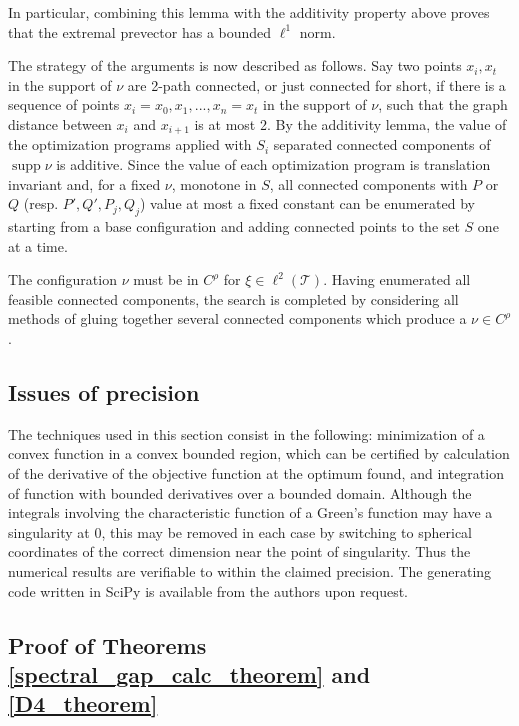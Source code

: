 \documentclass[a4paper, 12pt, notitlepage]{amsart}
\newcommand{\supp}{\operatorname{supp}}
\newcommand{\sT}{\mathscr{T}}
\theoremstyle{remark}
\begin{document}
In particular, combining this lemma with the additivity property above proves that the extremal prevector has a bounded $\ell^1$ norm.


The strategy of the arguments is now described as follows.  Say two points $x_i, x_t$ in the support of $\nu$ are  2-path connected, or just connected for short, if there is a sequence of points $x_i = x_0, x_1, ..., x_n = x_t$ in the support of $\nu$, such that the graph distance between $x_i$ and $x_{i+1}$ is at most 2. By the additivity lemma, the value of the optimization programs applied with $S_i$ separated connected components of $\supp \nu$ is additive.  Since the value of each optimization program is translation invariant and, for a fixed $\nu$, monotone in $S$, all connected components with $P$ or $Q$ (resp. $P', Q', P_j, Q_j$) value at most a fixed constant can be enumerated  by starting from a base configuration and adding connected points to the set $S$ one at a time.

The configuration $\nu$ must be in $C^\rho$ for $\xi \in \ell^2(\sT)$.  Having enumerated all feasible connected components, the search is completed by considering all methods of gluing together several connected components which produce a $\nu \in C^\rho$.  %

\subsection{Issues of precision}
The techniques used in this section consist in the following:
minimization of a convex function in a convex bounded region, which can be certified by calculation of the derivative of the objective function at the optimum found, and integration of function with bounded derivatives over a bounded domain.  Although the integrals involving the characteristic function of a Green's function may have a singularity at 0, this may be removed in each case by switching to spherical coordinates of the correct dimension near the point of singularity.  Thus the numerical results are verifiable to within the claimed precision.  The generating code written in SciPy is available from the authors upon request.  



\subsection{Proof of Theorems \ref{spectral_gap_calc_theorem} and \ref{D4_theorem}}
\end{document}
